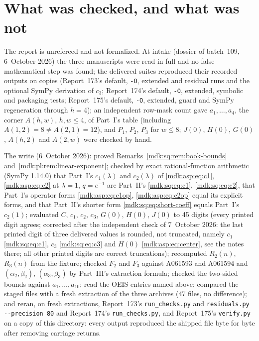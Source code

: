 \documentclass[11pt,letterpaper]{article}
\numberwithin{equation}{section}
\theoremstyle{remark}\newtheorem{remark}[theorem]{Remark}
\begin{document}
\section*{What was checked, and what was not}\label{mdk:sec:trust}
The report is unrefereed and not formalized. At intake (dossier of batch~109, 6~October 2026) the three manuscripts were read in full and no false mathematical step was found; the delivered suites reproduced their recorded outputs on copies (Report~173's default, \texttt{-O}, extended and residual runs and the optional SymPy derivation of $c_3$; Report~174's default, \texttt{-O}, extended, symbolic and packaging tests; Report~175's default, \texttt{-O}, extended, guard and SymPy regeneration through $h=4$); an independent row-mask count gave $a_1,\dots,a_4$, the corner $A(h,w)$, $h,w\le4$, of Part~I's table (including $A(1,2)=8\ne A(2,1)=12$), and $P_1$, $P_2$, $P_3$ for $w\le8$; $J(0)$, $H(0)$, $G(0)$, $A(h,2)$ and $A(2,w)$ were checked by hand.

The write (6~October 2026): proved Remarks~\ref{mdk:sq:rem:book-bounds} and~\ref{mdk:pl:rem:linear-exponent}; checked by exact rational-function arithmetic (SymPy 1.14.0) that Part~I's $c_1(\lambda)$ and $c_2(\lambda)$ of \eqref{mdk:asp:eq:c1}, \eqref{mdk:asp:eq:c2} at $\lambda=1$, $q=e^{-1}$ are Part~II's \eqref{mdk:sq:eq:c1}, \eqref{mdk:sq:eq:c2}, that Part~I's operator forms \eqref{mdk:asp:eq:c1op}, \eqref{mdk:asp:eq:c2op} equal its explicit forms, and that Part~II's shorter form \eqref{mdk:sq:eq:short-coeff} equals Part~I's $c_2(1)$; evaluated $C$, $c_1$, $c_2$, $c_3$, $G(0)$, $H(0)$, $J(0)$ to 45 digits (every printed digit agrees; \textup{corrected after the independent check of 7~October 2026: the last printed digit of three delivered values is rounded, not truncated, namely $c_1$ \eqref{mdk:sq:eq:c1}, $c_3$ \eqref{mdk:sq:eq:c3} and $H(0)$ \eqref{mdk:asp:eq:center}, see the notes there; all other printed digits are correct truncations}); recomputed $R_2(n)$, $R_3(n)$ from the fixture; checked $F_2$ and $F_3$ against A061593 and A061594 and $(\alpha_2,\beta_2)$, $(\alpha_3,\beta_3)$ by Part~III's extraction formula; checked the two-sided bounds against $a_1,\dots,a_{10}$; read the OEIS entries named above; compared the staged files with a fresh extraction of the three archives (47 files, no difference); and reran, on fresh extractions, Report~173's \texttt{run\_checks.py} and \texttt{residuals.py -{}-precision 80} and Report~174's \texttt{run\_checks.py}, and Report~175's \texttt{verify.py} on a copy of this directory: every output reproduced the shipped file byte for byte after removing carriage returns.
\end{document}
